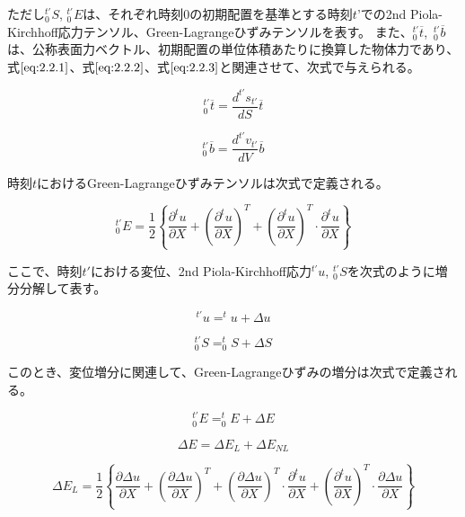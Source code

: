 \documentclass[a4paper,pandoc,ja=standard]{bxjsarticle}
\begin{document}
ただし\(^{t'}_0 S\), \(^{t'}_0 E\)は、それぞれ時刻\(0\)の初期配置を基準とする時刻\(t’\)での2nd Piola-Kirchhoff応力テンソル、Green-Lagrangeひずみテンソルを表す。
また、\(_{0}^{t'}\overline{t}\), \(\,_0^{t'}\overline{b}\)は、公称表面力ベクトル、初期配置の単位体積あたりに換算した物体力であり、式\(\eqref{eq:2.2.1}\)、式\(\eqref{eq:2.2.2}\)、式\(\eqref{eq:2.2.3}\)と関連させて、次式で与えられる。

\begin{equation}
^{t'}_0\overline{t}=\frac{d^{t'}s_{t'}}{dS}\overline{t}
\label{eq:2.2.8}
\end{equation}

\begin{equation}
^{t'}_0\overline{b}=\frac{d^{t'}v_{t'}}{dV}\overline{b}
\label{eq:2.2.9}
\end{equation}

時刻\(t\)におけるGreen-Lagrangeひずみテンソルは次式で定義される。

\begin{equation}
^{t'}_{0} E=\frac{1}{2}
\left\lbrace
  \frac{\partial ^{t}u}{\partial X}
 +\left(\frac{\partial ^{t} u}{\partial X} \right)^T
 +\left(\frac{\partial ^{t} u}{\partial X}\right)^T
 \cdot \frac{\partial ^{t} u}{\partial X}
\right\rbrace
\label{eq:2.2.10}
\end{equation}

ここで、時刻\(t'\)における変位、2nd Piola-Kirchhoff応力\(^{t'} u\), \(_{0}^{t'} S\)を次式のように増分分解して表す。

\begin{equation}
^{t'} u =^{t} u + \Delta u
\label{eq:2.2.11}
\end{equation}

\begin{equation}
_{0}^{t'} S = _{0}^{t} S + \Delta S
\label{eq:2.2.12}
\end{equation}

このとき、変位増分に関連して、Green-Lagrangeひずみの増分は次式で定義される。

\begin{equation}
_{0}^{t'} E = _{0}^{t} E + \Delta E
\label{eq:2.2.13}
\end{equation}

\begin{equation}
\Delta E = \Delta E_{L} + \Delta E_{NL}
\label{eq:2.2.14}
\end{equation}

\begin{equation}
\Delta E_L=\frac{1}{2}
\left\lbrace
\frac{\partial \Delta u}{\partial X}
+\left(\frac{\partial \Delta u}{\partial X}\right)^T
+\left(\frac{\partial \Delta u}{\partial X} \right)^T\cdot
\frac{\partial ^{t} u}{\partial X}
+\left(\frac{\partial ^{t} u}{\partial X} \right)^T
\cdot\frac{\partial \Delta u}{\partial X} \right\rbrace
\label{eq:2.2.15}
\end{equation}
\end{document}
